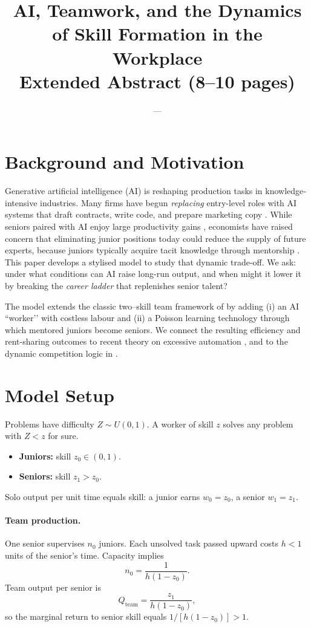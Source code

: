 \documentclass[12pt]{article}
\title{AI, Teamwork, and the Dynamics of Skill Formation in the Workplace\\
\normalsize Extended Abstract (8--10 pages)}
\author{---}
\date{}
\begin{document}
\maketitle

\section{Background and Motivation}

Generative artificial intelligence (AI) is reshaping production tasks in knowledge‐intensive industries.  Many firms have begun \emph{replacing} entry-level roles with AI systems that draft contracts, write code, and prepare marketing copy \citep{Appelo2025}.  While seniors paired with AI enjoy large productivity gains \citep{BrynjolfssonLiRaymond2023}, economists have raised concern that eliminating junior positions today could reduce the supply of future experts, because juniors typically acquire tacit knowledge through mentorship \citep{Hess2023,Muehlemann2024}.  This paper develops a stylised model to study that dynamic trade-off.  We ask: under what conditions can AI raise long-run output, and when might it lower it by breaking the \emph{career ladder} that replenishes senior talent?

The model extends the classic two–skill team framework of \citet{Garicano2000} by adding (i) an AI ``worker’’ with costless labour and (ii) a Poisson learning technology through which mentored juniors become seniors.  We connect the resulting efficiency and rent-sharing outcomes to recent theory on excessive automation \citep{AcemogluRestrepo2018,Acemoglu2024}, and to the dynamic competition logic in \citet{BueraBeraja2025}.

\section{Model Setup}

Problems have difficulty $Z\sim U(0,1)$.  A worker of skill $z$ solves any problem with $Z<z$ for sure.

\begin{itemize}
    \item \textbf{Juniors:} skill $z_{0}\in(0,1)$.
    \item \textbf{Seniors:} skill $z_{1}>z_{0}$.
\end{itemize}

Solo output per unit time equals skill: a junior earns $w_{0}=z_{0}$, a senior $w_{1}=z_{1}$.

\paragraph{Team production.}  One senior supervises $n_{0}$ juniors.  Each unsolved task passed upward costs $h<1$ units of the senior’s time.  Capacity implies
\[
n_{0} = \frac{1}{h(1-z_{0})}.
\]
Team output per senior is
\[
Q_{\text{team}} = \frac{z_{1}}{h(1-z_{0})},
\]
so the marginal return to senior skill equals $1/[h(1-z_{0})]>1$.
\end{document}
